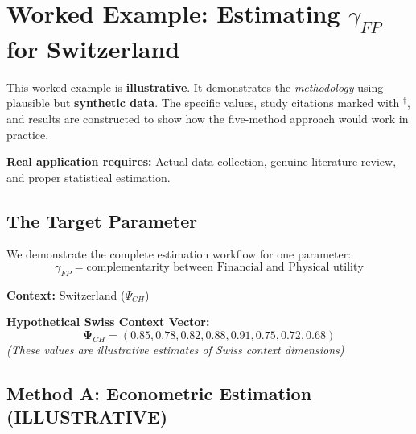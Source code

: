 \documentclass[11pt,a4paper]{article}
\theoremstyle{definition}
\begin{document}



\section{Worked Example: Estimating $\gamma_{FP}$ for Switzerland}
\label{sec:bbb-example}

\begin{tcolorbox}[colback=orange!10!white, colframe=orange!75!black, 
    title=\textbf{⚠ NOTE: HYPOTHETICAL EXAMPLE}]
    
This worked example is \textbf{illustrative}. It demonstrates the \textit{methodology} 
using plausible but \textbf{synthetic data}. The specific values, study citations 
marked with $^\dagger$, and results are constructed to show how the five-method 
approach would work in practice.

\textbf{Real application requires:} Actual data collection, genuine literature 
review, and proper statistical estimation.

\end{tcolorbox}

\subsection{The Target Parameter}

We demonstrate the complete estimation workflow for one parameter:
\begin{equation}
\gamma_{FP} = \text{complementarity between Financial and Physical utility}
\end{equation}

\textbf{Context:} Switzerland ($\Psi_{CH}$)

\textbf{Hypothetical Swiss Context Vector:}
\[
\boldsymbol{\Psi}_{CH} = (0.85, 0.78, 0.82, 0.88, 0.91, 0.75, 0.72, 0.68)
\]
\textit{(These values are illustrative estimates of Swiss context dimensions)}

\subsection{Method A: Econometric Estimation (ILLUSTRATIVE)}
\end{document}
